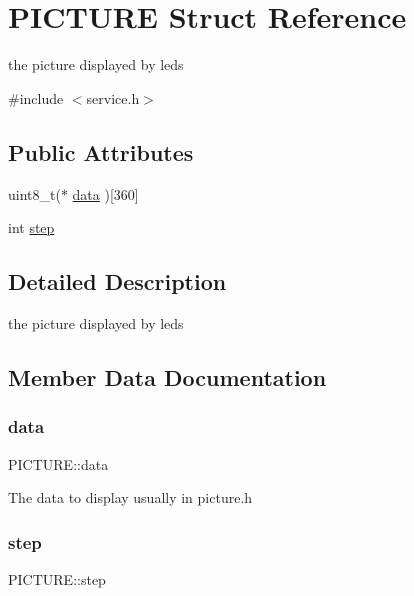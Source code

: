 \hypertarget{struct_p_i_c_t_u_r_e}{}\section{P\+I\+C\+T\+U\+RE Struct Reference}
\label{struct_p_i_c_t_u_r_e}


the picture displayed by leds  




{\ttfamily \#include $<$service.\+h$>$}

\subsection*{Public Attributes}
\begin{DoxyCompactItemize}
\item 
uint8\+\_\+t($\ast$ \mbox{\hyperlink{struct_p_i_c_t_u_r_e_ac04cfbdfca7bd69dad5e0ea6cf13dd32}{data}} )\mbox{[}360\mbox{]}
\item 
int \mbox{\hyperlink{struct_p_i_c_t_u_r_e_a1073fabddc8e98b0ca92bed4f7242e3f}{step}}
\end{DoxyCompactItemize}


\subsection{Detailed Description}
the picture displayed by leds 

\subsection{Member Data Documentation}
\mbox{\label{struct_p_i_c_t_u_r_e_ac04cfbdfca7bd69dad5e0ea6cf13dd32}} 
\subsubsection{\texorpdfstring{data}{data}}
{\footnotesize\ttfamily P\+I\+C\+T\+U\+R\+E\+::data}

The data to display usually in picture.\+h \mbox{\label{struct_p_i_c_t_u_r_e_a1073fabddc8e98b0ca92bed4f7242e3f}} 
\subsubsection{\texorpdfstring{step}{step}}
{\footnotesize\ttfamily P\+I\+C\+T\+U\+R\+E\+::step}

